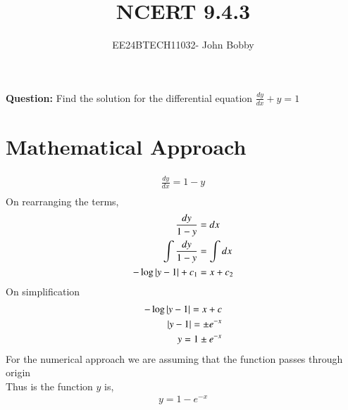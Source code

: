 \documentclass[journal,12pt,onecolumn]{IEEEtran}
\theoremstyle{remark}
\begin{document}

\vspace{3cm}

\title{\textbf{NCERT 9.4.3}}
\author{EE24BTECH11032- John Bobby}
\maketitle
\bigskip
\textbf{Question:} Find the solution for the differential equation $\frac{dy}{dx}+y=1$\\
\section{Mathematical Approach} 
\begin{align*}
    \frac{dy}{dx}=1-y\\
\end{align*}
On rearranging the terms,
\begin{align*}
    \frac{dy}{1-y}&=dx\\
    \int \frac{dy}{1-y}&=\int dx\\
    -\log{\left\vert y-1\right\vert}+c_1&=x+c_2
\end{align*}
On simplification 
\begin{align*}
    -\log{\left\vert y-1\right\vert}=x+c\\
    \left\vert y-1\right\vert=\pm e^{-x}\\
    y=1\pm e^{-x}\\
\end{align*}
For the numerical approach we are assuming that the function passes through origin\\
Thus is the function $y$ is,
\begin{align*}
    y=1-e^{-x}
\end{align*}
\end{document}
